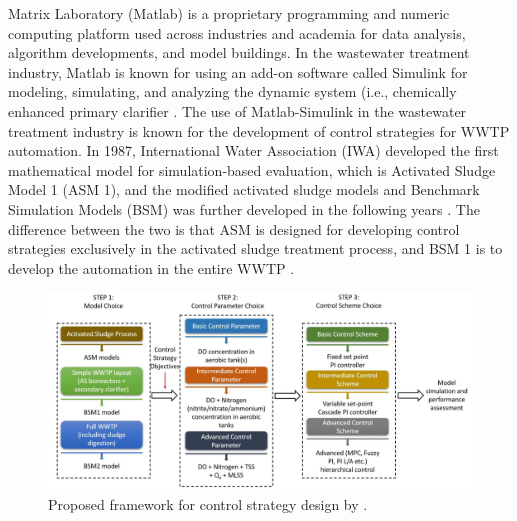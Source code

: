 Matrix Laboratory (Matlab) is a proprietary programming and numeric computing platform used across industries and academia for data analysis, algorithm developments, and model buildings. In the wastewater treatment industry, Matlab is known for using an add-on software called Simulink for modeling, simulating, and analyzing the dynamic system (i.e., chemically enhanced primary clarifier \citep{bachisModellingCharacterizationPrimary2015}. The use of Matlab-Simulink in the wastewater treatment industry is known for the development of control strategies for WWTP automation. In 1987, International Water Association (IWA) developed the first mathematical model for simulation-based evaluation, which is Activated Sludge Model 1 (ASM 1), and the modified activated sludge models and Benchmark Simulation Models (BSM) was further developed in the following years \citep{talibModelingControlWastewater2011}. The difference between the two is that ASM is designed for developing control strategies exclusively in the activated sludge treatment process, and BSM 1 is to develop the automation in the entire WWTP \citep{ballhysaWastewaterTreatmentPlant2020}. 

\begin{figure}[h]
   \centering
   \includegraphics[width=0.9\columnwidth]{imgs/propose-frameworks-for-control-strategy-design.png}
   \caption{Proposed framework for control strategy design by \citet{ballhysaWastewaterTreatmentPlant2020}.}
   \label{fig:control-strategy-design}
\end{figure}
 
